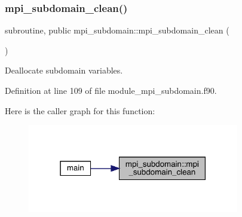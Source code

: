 \subsubsection{\texorpdfstring{mpi\_subdomain\_clean()}{mpi\_subdomain\_clean()}}
{\footnotesize\ttfamily subroutine, public mpi\+\_\+subdomain\+::mpi\+\_\+subdomain\+\_\+clean (\begin{DoxyParamCaption}{ }\end{DoxyParamCaption})}



Deallocate subdomain variables. 



Definition at line 109 of file module\+\_\+mpi\+\_\+subdomain.\+f90.

Here is the caller graph for this function\+:
\nopagebreak
\begin{figure}[H]
\begin{center}
\leavevmode
\includegraphics[width=262pt]{namespacempi__subdomain_a56e9f2afd59e45fcada0f1c21a90eefe_icgraph}
\end{center}
\end{figure}
\mbox{\label{namespacempi__subdomain_a2e34a77537009dd448375e8fdc8d5b62}} 

